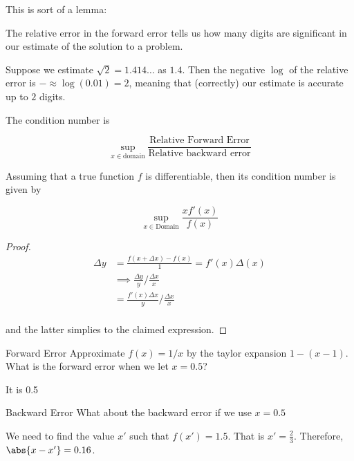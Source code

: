 \documentclass[../main.tex]{subfiles}
\begin{document}
\begin{lemma}
    This is sort of a lemma:

    The relative error in the forward error tells us how many digits are significant in our estimate of the solution to a problem.
\end{lemma}

\begin{example}
    Suppose we estimate $\sqrt{2} = 1.414\dots$ as $1.4$. Then the negative $\log$ of the relative error is $-\approx \log(0.01) = 2$, meaning
    that (correctly) our estimate is accurate up to $2$ digits.
\end{example}

\begin{definition}
    The condition number is 

    \[
        \sup_{x \in \text{domain}} \frac{\text{Relative Forward Error}}{\text{Relative backward error}}
    \]
\end{definition}

\begin{theorem}
    Assuming that a true function $f$ is differentiable, then its condition number is given by 

    \[
        \sup_{x \in \text{Domain}}\frac{x f'(x)}{f(x)}
    \]
\end{theorem}

\begin{proof}
    \begin{align*}
        \Delta y &= \frac{f(x + \Delta x) - f(x)}{1} = f'(x) \Delta (x) \\
        &\implies \frac{\Delta y}{y} / \frac{\Delta x}{x}  \\
        &= \frac{f'(x) \Delta x}{y} / \frac{\Delta x}{x}  \\
    \end{align*}

    and the latter simplies to the claimed expression.
\end{proof}


\begin{problem}{Forward Error}
    Approximate $f(x) = 1/x$ by the taylor expansion $1 - (x - 1)$. What is the forward error when we let $x = 0.5$?
\end{problem}

It is 0.5

\begin{problem}{Backward Error}
    What about the backward error if we use $x = 0.5$
\end{problem}
We need to find the value $x'$ such that $f(x') = 1.5$. That is $x' = \frac{2}{3}$. Therefore, $\abs{x - x'} = 0.16$.
\end{document}
